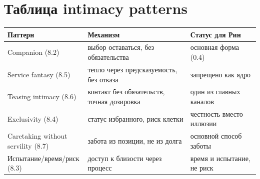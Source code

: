 \section{Таблица intimacy patterns}

\begin{center}
\begin{tabular}{p{3.6cm}p{4.2cm}p{4.2cm}}
\textbf{Паттерн} & \textbf{Механизм} & \textbf{Статус для Рин} \\
\hline
Companion (8.2) & выбор оставаться, без обязательства & основная форма (0.4) \\
Service fantasy (8.5) & тепло через предсказуемость, без отказа & запрещено как ядро \\
Teasing intimacy (8.6) & контакт без обязательств, точная дозировка & один из главных каналов \\
Exclusivity (8.4) & статус избранного, риск клетки & честность вместо иллюзии \\
Caretaking without servility (8.7) & забота из позиции, не из долга & основной способ заботы \\
Испытание/время/риск (8.3) & доступ к близости через процесс & время и испытание, не риск \\
\end{tabular}
\end{center}
